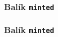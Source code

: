 \subsubsection{Balík \texttt{minted}}
\begin{frame}
	\frametitle{Balík \texttt{minted}}
	\UnderConstruction
\end{frame}

\endinput
